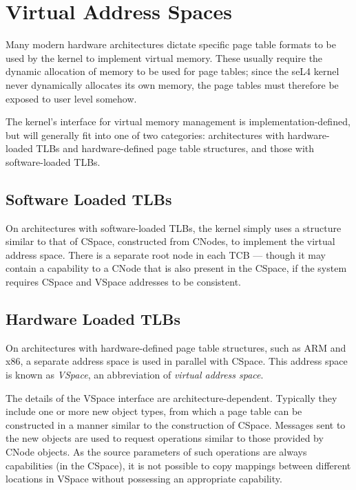 \section{Virtual Address Spaces}\label{sec:overview.vm}

Many modern hardware architectures dictate specific page table formats to be
used by the kernel to implement virtual memory. These usually require the
dynamic allocation of memory to be used for page tables; since the seL4 kernel
never dynamically allocates its own memory, the page tables must therefore be
exposed to user level somehow.

The kernel's interface for virtual memory management is
implementation-defined, but will generally fit into one of two categories:
architectures with hardware-loaded TLBs and hardware-defined page table
structures, and those with software-loaded TLBs.

\subsection{Software Loaded TLBs}

On architectures with software-loaded TLBs, the kernel simply uses a structure
similar to that of CSpace, constructed from CNodes, to implement the virtual
address space. There is a separate root node in each TCB --- though it may
contain a capability to a CNode that is also present in the CSpace, if the
system requires CSpace and VSpace addresses to be consistent.

\subsection{Hardware Loaded TLBs}

On architectures with hardware-defined page table structures, such as ARM and
x86, a separate address space is used in parallel with CSpace. This address
space is known as \emph{VSpace}, an abbreviation of \emph{virtual address
space}.

The details of the VSpace interface are architecture-dependent. Typically they
include one or more new object types, from which a page table can be
constructed in a manner similar to the construction of CSpace. Messages sent
to the new objects are used to request operations similar to those provided by
CNode objects. As the source parameters of such operations are always
capabilities (in the CSpace), it is not possible to copy mappings between
different locations in VSpace without possessing an appropriate capability.

